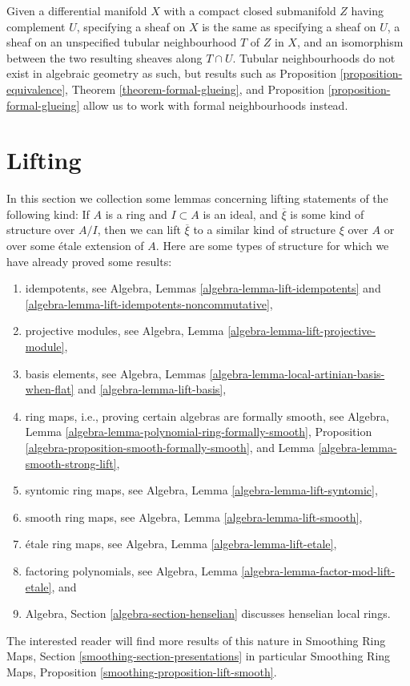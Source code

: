 \begin{remark}
\label{remark-topological-analogue}
Given a differential manifold $X$ with a compact closed submanifold $Z$
having complement $U$, specifying a sheaf on $X$ is the same as specifying
a sheaf on $U$, a sheaf on an unspecified tubular neighbourhood $T$ of $Z$ in
$X$, and an isomorphism between the two resulting sheaves along $T \cap U$.
Tubular neighbourhoods do not exist in algebraic geometry as such, but
results such as
Proposition \ref{proposition-equivalence},
Theorem \ref{theorem-formal-glueing}, and
Proposition \ref{proposition-formal-glueing}
allow us to work with formal neighbourhoods instead.
\end{remark}



\section{Lifting}
\label{section-lifting}

\noindent
In this section we collection some lemmas concerning lifting
statements of the following kind: If $A$ is a ring and $I \subset A$
is an ideal, and $\overline{\xi}$ is some kind of structure over
$A/I$, then we can lift $\overline{\xi}$ to a similar kind of structure
$\xi$ over $A$ or over some \'etale extension of $A$. Here are some types
of structure for which we have already proved some results:
\begin{enumerate}
\item idempotents, see
Algebra, Lemmas \ref{algebra-lemma-lift-idempotents} and
\ref{algebra-lemma-lift-idempotents-noncommutative},
\item projective modules, see
Algebra, Lemma \ref{algebra-lemma-lift-projective-module},
\item basis elements, see
Algebra, Lemmas \ref{algebra-lemma-local-artinian-basis-when-flat} and
\ref{algebra-lemma-lift-basis},
\item ring maps, i.e., proving certain algebras are formally smooth, see
Algebra, Lemma \ref{algebra-lemma-polynomial-ring-formally-smooth},
Proposition \ref{algebra-proposition-smooth-formally-smooth}, and
Lemma \ref{algebra-lemma-smooth-strong-lift},
\item syntomic ring maps, see
Algebra, Lemma \ref{algebra-lemma-lift-syntomic},
\item smooth ring maps, see
Algebra, Lemma \ref{algebra-lemma-lift-smooth},
\item \'etale ring maps, see
Algebra, Lemma \ref{algebra-lemma-lift-etale},
\item factoring polynomials, see
Algebra, Lemma \ref{algebra-lemma-factor-mod-lift-etale}, and
\item Algebra, Section \ref{algebra-section-henselian} discusses henselian
local rings.
\end{enumerate}
The interested reader will find more results of this nature in
Smoothing Ring Maps, Section \ref{smoothing-section-presentations}
in particular
Smoothing Ring Maps, Proposition \ref{smoothing-proposition-lift-smooth}.


